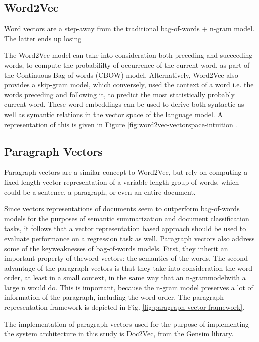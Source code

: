\documentclass[conference]{IEEEtran}
\begin{document}
    \subsection{Word2Vec} \label{Word2Vec}
        Word vectors are a step-away from the traditional bag-of-words + n-gram model. The latter ends up losing

        The Word2Vec model\cite{mikolov2013efficient} can take into consideration both preceding and succeeding words, to compute the probabililty of occurrence of the current word, as part of the Continuous Bag-of-words (CBOW) model. Alternatively, Word2Vec also provides a skip-gram model\cite{mikolov2013distributed}, which conversely, used the context of a word i.e. the words preceding and following it, to predict the most statistically probably current word. These word embeddings can be used to derive both syntactic as well as symantic relations in the vector space of the language model. A representation of this is given in Figure \ref{fig:word2vec-vectorspace-intuition}.

    \subsection{Paragraph Vectors}
        Paragraph vectors are a similar concept to Word2Vec, but rely on computing a fixed-length vector representation of a variable length group of words, which could be a sentence, a paragraph, or even an entire document.

        Since vectors representations of documents seem to outperform bag-of-words models for the purposes of semantic summarization and document classification tasks, it follows that a vector representation based approach should be used to evaluate performance on a regression task as well. Paragraph vectors also address some of the keyweaknesses of bag-of-words models. First, they inherit an important property of theword vectors: the semantics of the words. The second advantage of the paragraph vectors is that they take into consideration the word order, at least in a small context, in the same way that an n-grammodelwith a large n would do. This is important, because the n-gram model preserves a lot of information of the paragraph, including the word order\cite{le2014distributed}. The paragraph representation framework is depicted in Fig. \ref{fig:paragraph-vector-framework}.

        The implementation of paragraph vectors used for the purpose of implementing the system architecture in this study is Doc2Vec, from the Gensim library\cite{doc2vec_api}.
\end{document}
